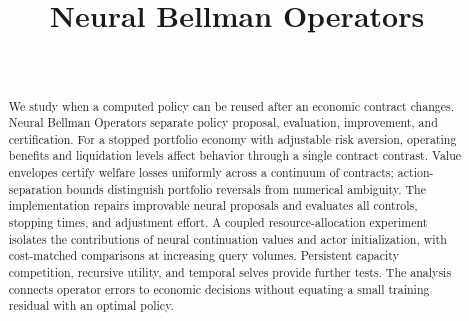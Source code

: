\documentclass[ecta]{econsocart}
\begin{document}
\begin{frontmatter}
\title{Neural Bellman Operators}
\begin{aug}
\author[id=au1,addressref={add1}]{~}
\address[id=add1]{,}
\end{aug}
\begin{abstract}
We study when a computed policy can be reused after an economic contract changes. Neural Bellman Operators separate policy proposal, evaluation, improvement, and certification. For a stopped portfolio economy with adjustable risk aversion, operating benefits and liquidation levels affect behavior through a single contract contrast. Value envelopes certify welfare losses uniformly across a continuum of contracts; action-separation bounds distinguish portfolio reversals from numerical ambiguity. The implementation repairs improvable neural proposals and evaluates all controls, stopping times, and adjustment effort. A coupled resource-allocation experiment isolates the contributions of neural continuation values and actor initialization, with cost-matched comparisons at increasing query volumes. Persistent capacity competition, recursive utility, and temporal selves provide further tests. The analysis connects operator errors to economic decisions without equating a small training residual with an optimal policy.
\end{abstract}
\begin{keyword}
\end{keyword}
\end{frontmatter}









\end{document}
